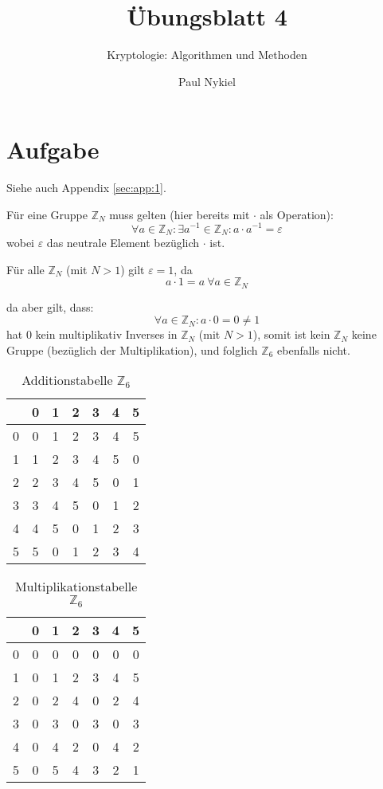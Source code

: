 \documentclass[DIN, pagenumber=false, fontsize=11pt, parskip=half]{scrartcl}
\title{Übungsblatt 4}
\subtitle{Kryptologie: Algorithmen und Methoden}
\author{Paul Nykiel}
\begin{document}
    \maketitle
    \section{Aufgabe}
    Siehe auch Appendix \ref{sec:app:1}.

    Für eine Gruppe $\mathbb{Z}_N$ muss gelten (hier bereits mit $\cdot$ als Operation):
    \begin{equation}
        \forall a \in \mathbb{Z}_N: \exists a^{-1} \in \mathbb{Z}_N: a \cdot a^{-1} = \varepsilon
    \end{equation}
    wobei $\varepsilon$ das neutrale Element bezüglich $\cdot$ ist.

    Für alle $\mathbb{Z}_N$ (mit $N>1$) gilt $\varepsilon=1$, da
    \begin{equation}
        a \cdot 1 = a\ \forall a \in \mathbb{Z}_N 
    \end{equation} 
    
    da aber gilt, dass:
    \begin{equation}
        \forall a \in \mathbb{Z}_N: a \cdot 0 = 0 \neq 1
    \end{equation} 
    hat $0$ kein multiplikativ Inverses in $\mathbb{Z}_N$ (mit $N>1$), somit ist
    kein $\mathbb{Z}_N$ keine Gruppe (bezüglich der Multiplikation), 
    und folglich $\mathbb{Z}_6$ ebenfalls nicht.

    \begin{table}[H]
    \centering
    \begin{tabular}{c|cccccc}
    \toprule
     & 0 & 1 & 2 & 3 & 4 & 5\\
    \midrule
    0 & 0 & 1 & 2 & 3 & 4 & 5\\
    1 & 1 & 2 & 3 & 4 & 5 & 0\\
    2 & 2 & 3 & 4 & 5 & 0 & 1\\
    3 & 3 & 4 & 5 & 0 & 1 & 2\\
    4 & 4 & 5 & 0 & 1 & 2 & 3\\
    5 & 5 & 0 & 1 & 2 & 3 & 4\\
    \bottomrule
    \end{tabular}
    \caption{Additionstabelle $\mathbb{Z}_6$}
    \end{table}

    \begin{table}[H]
    \centering
    \begin{tabular}{c|cccccc}
    \toprule
     & 0 & 1 & 2 & 3 & 4 & 5\\
    \midrule
    0 & 0 & 0 & 0 & 0 & 0 & 0\\
    1 & 0 & 1 & 2 & 3 & 4 & 5\\
    2 & 0 & 2 & 4 & 0 & 2 & 4\\
    3 & 0 & 3 & 0 & 3 & 0 & 3\\
    4 & 0 & 4 & 2 & 0 & 4 & 2\\
    5 & 0 & 5 & 4 & 3 & 2 & 1\\
    \bottomrule
    \end{tabular}
    \caption{Multiplikationstabelle $\mathbb{Z}_6$}
    \label{tab:mul6}
    \end{table}
\end{document}
